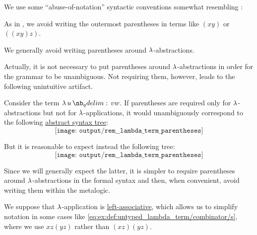 \begin{remark}\label{rem:lambda_term_parentheses}
  We use some \enquote{abuse-of-notation} syntactic conventions somewhat resembling :
  \begin{thmenum}
     As in , we avoid writing the outermost parentheses in terms like \( (xy) \) or \( ((xy)z) \).

     We generally avoid writing parentheses around \( \mathrm{\lambda} \)-abstractions.

    Actually, it is not necessary to put parentheses around \( \mathrm{\lambda} \)-abstractions in order for the grammar to be unambiguous. Not requiring them, however, leads to the following unintuitive artifact.

    Consider the term \( \qabs u v w \). If parentheses are required only for \( \mathrm{\lambda} \)-abstractions but not for \( \mathrm{\lambda} \)-applications, it would unambiguously correspond to the following \hyperref[rem:lambda_term_ast]{abstract syntax tree}:
    \begin{equation*}
      \texttt{[image: output/rem\_\_lambda\_term\_parentheses]}
    \end{equation*}

    But it is reasonable to expect instead the following tree:
    \begin{equation*}
      \texttt{[image: output/rem\_\_lambda\_term\_parentheses]}
    \end{equation*}

    Since we will generally expect the latter, it is simpler to require parentheses around \( \mathrm{\lambda} \)-abstractions in the formal syntax and then, when convenient, avoid writing them within the metalogic.

     We suppose that \( \mathrm{\lambda} \)-application is \hyperref[rem:binary_operation_syntax_trees/associativity]{left-associative}, which allows us to simplify notation in some cases like \eqref{eq:ex:def:untyped_lambda_term/combinator/s}, where we use \( xz(yz) \) rather than \( (xz)(yz) \).
  \end{thmenum}
\end{remark}

